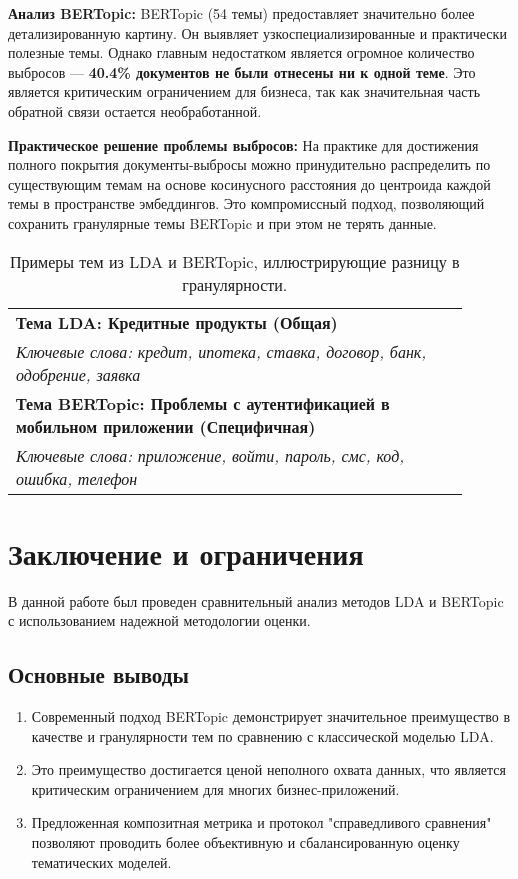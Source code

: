 \documentclass{article}
\begin{document}
\textbf{Анализ BERTopic:} BERTopic (54 темы) предоставляет значительно более детализированную картину. Он выявляет узкоспециализированные и практически полезные темы. Однако главным недостатком является огромное количество выбросов — \textbf{40.4\% документов не были отнесены ни к одной теме}. Это является критическим ограничением для бизнеса, так как значительная часть обратной связи остается необработанной.

\textbf{Практическое решение проблемы выбросов:} На практике для достижения полного покрытия документы-выбросы можно принудительно распределить по существующим темам на основе косинусного расстояния до центроида каждой темы в пространстве эмбеддингов. Это компромиссный подход, позволяющий сохранить гранулярные темы BERTopic и при этом не терять данные.

\begin{table}[!tbh]
    \centering
    \begin{tabular}{|p{0.9\linewidth}|}
\hline
\textbf{Тема LDA: Кредитные продукты (Общая)} \\
\small\textit{Ключевые слова: кредит, ипотека, ставка, договор, банк, одобрение, заявка} \\
\hline
\textbf{Тема BERTopic: Проблемы с аутентификацией в мобильном приложении (Специфичная)} \\
\small\textit{Ключевые слова: приложение, войти, пароль, смс, код, ошибка, телефон} \\
\hline
    \end{tabular}
    \caption{Примеры тем из LDA и BERTopic, иллюстрирующие разницу в гранулярности.}
    \label{tab:output_samples}
\end{table}


\section{Заключение и ограничения}
В данной работе был проведен сравнительный анализ методов LDA и BERTopic с использованием надежной методологии оценки.

\subsection{Основные выводы}
\begin{enumerate}
    \item Современный подход BERTopic демонстрирует значительное преимущество в качестве и гранулярности тем по сравнению с классической моделью LDA.
    \item Это преимущество достигается ценой неполного охвата данных, что является критическим ограничением для многих бизнес-приложений.
    \item Предложенная композитная метрика и протокол "справедливого сравнения" позволяют проводить более объективную и сбалансированную оценку тематических моделей.
\end{enumerate}
\end{document}
